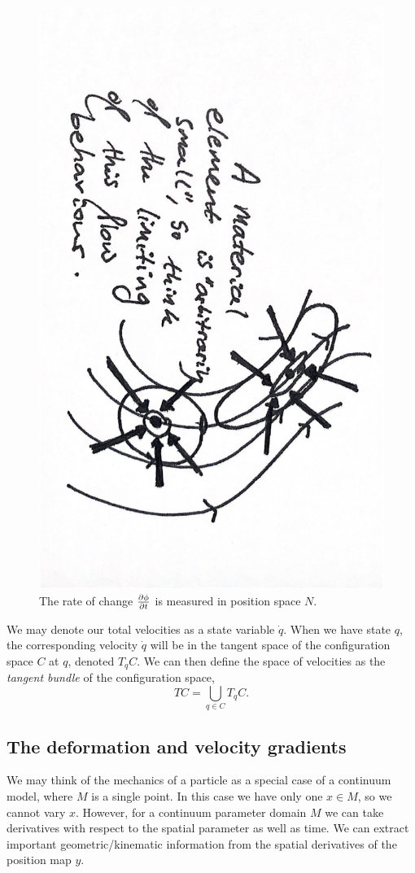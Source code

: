 \begin{figure}[H]
\centerline{\includegraphics[angle=90,page=3,width=0.8\linewidth]{figures/2.pdf}}
\caption{
    The rate of change $\frac{\partial \phi}{\partial t}$ is measured in position space $N$.
}
\label{sketch_rate_of_change}
\end{figure}
We may denote our total velocities as a state variable $\dot{q}$. 
When we have state $q$, the corresponding velocity $\dot{q}$ will be in the tangent space of the configuration space $C$ at $q$, denoted $T_q C$.
We can then define the space of velocities as the \textit{tangent bundle} of the configuration space,
    $$TC = \bigcup_{q \in C} T_q C.$$
\subsection{The deformation and velocity gradients}\label{deformation_and_velocity_gradients}
We may think of the mechanics of a particle as a special case of a continuum model, where
$M$ is a single point. In this case we have only one $x \in M$, so we cannot vary $x$.
However, for a continuum parameter domain $M$ we can take derivatives with respect to the spatial parameter as well as time.
We can extract important geometric/kinematic information from the spatial derivatives of the position map $y$.

